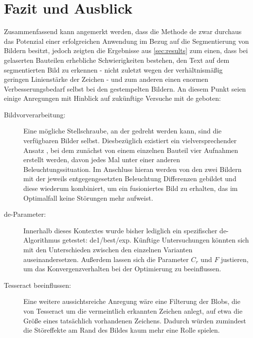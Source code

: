 \chapter{Fazit und Ausblick}
\label{sec:summary}

	Zusammenfassend kann angemerkt werden, dass die Methode \gls{de} zwar durchaus das Potenzial einer erfolgreichen Anwendung im Bezug auf die Segmentierung von Bildern besitzt, jedoch zeigten die Ergebnisse aus \ref{sec:results} zum einen, dass bei gelaserten Bauteilen erhebliche Schwierigkeiten bestehen, den Text auf dem segmentierten Bild zu erkennen - nicht zuletzt wegen der verhältnismäßig geringen Linienstärke der Zeichen - und zum anderen einen enormen Verbesserungsbedarf selbst bei den gestempelten Bildern. An diesem Punkt seien einige Anregungen mit Hinblick auf zukünftige Versuche mit \gls{de} geboten:
	
	\begin{description}
		\item[Bildvorverarbeitung:] Eine mögliche Stellschraube, an der gedreht werden kann, sind die verfügbaren Bilder selbst. Diesbezüglich existiert ein vielversprechender Ansatz \cite{chinese-method}, bei dem zunächst von einem einzelnen Bauteil vier Aufnahmen erstellt werden, davon jedes Mal unter einer anderen Beleuchtungssituation. Im Anschluss hieran werden von den zwei Bildern mit der jeweils entgegengesetzten Beleuchtung Differenzen gebildet und diese wiederum kombiniert, um ein fusioniertes Bild zu erhalten, das im Optimalfall keine Störungen mehr aufweist.
		\item[\gls{de}-Parameter:] Innerhalb dieses Kontextes wurde bisher lediglich ein spezifischer \gls{de}-Algorithmus getestet: \gls{de}1/best/exp. Künftige Untersuchungen könnten sich mit den Unterschieden zwischen den einzelnen Varianten auseinandersetzen. Außerdem lassen sich die Parameter $C_{r}$ und $F$ justieren, um das Konvergenzverhalten bei der Optimierung zu beeinflussen.
		\item[Tesseract beeinflussen:] Eine weitere aussichtsreiche Anregung wäre eine Filterung der Blobs, die von Tesseract um die vermeintlich erkannten Zeichen anlegt, auf etwa die Größe eines tatsächlich vorhandenen Zeichens. Dadurch würden zumindest die Störeffekte am Rand des Bildes kaum mehr eine Rolle spielen.
	\end{description}